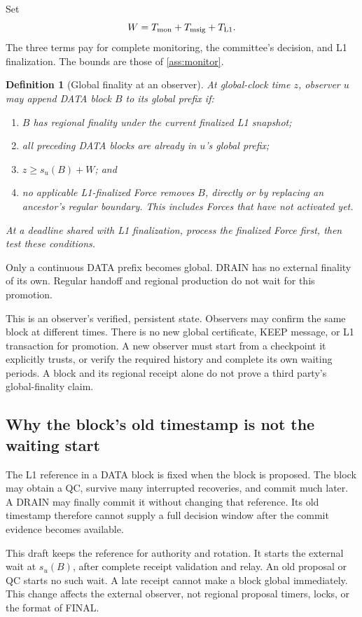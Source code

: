 \documentclass[11pt,a4paper]{article}
\newtheorem{definition}{Definition}[section]
\begin{document}
Set
\[
 W=T_{\rm mon}+T_{\rm msig}+T_{\rm L1}.
\]
The three terms pay for complete monitoring, the committee's decision,
and L1 finalization. The bounds are those of \cref{ass:monitor}.

\begin{definition}[Global finality at an observer]
\label{def:global-finality}
At global-clock time $z$, observer $u$ may append DATA block $B$ to its
global prefix if:
\begin{enumerate}[label=(\roman*)]
\item $B$ has regional finality under the current finalized L1 snapshot;
\item all preceding DATA blocks are already in $u$'s global prefix;
\item $z\ge s_u(B)+W$; and
\item no applicable L1-finalized Force removes $B$, directly or by
replacing an ancestor's regular boundary. This includes Forces that
have not activated yet.
\end{enumerate}
At a deadline shared with L1 finalization, process the finalized Force
first, then test these conditions.
\end{definition}
Only a continuous DATA prefix becomes global. DRAIN has no external
finality of its own. Regular handoff and regional production do not
wait for this promotion.

This is an observer's verified, persistent state. Observers may confirm
the same block at different times. There is no new global certificate,
KEEP message, or L1 transaction for promotion. A new observer must
start from a checkpoint it explicitly trusts, or verify the required
history and complete its own waiting periods. A block and its regional
receipt alone do not prove a third party's global-finality claim.

\subsection{Why the block's old timestamp is not the waiting start}
\label{sec:late-receipt}
The L1 reference in a DATA block is fixed when the block is proposed.
The block may obtain a QC, survive many interrupted recoveries, and
commit much later. A DRAIN may finally commit it without changing that
reference. Its old timestamp therefore cannot supply a full decision
window after the commit evidence becomes available.

This draft keeps the reference for authority and rotation. It starts the
external wait at $s_u(B)$, after complete receipt validation and relay.
An old proposal or QC starts no such wait. A late receipt cannot make a
block global immediately. This change affects the external observer,
not regional proposal timers, locks, or the format of FINAL.
\end{document}
